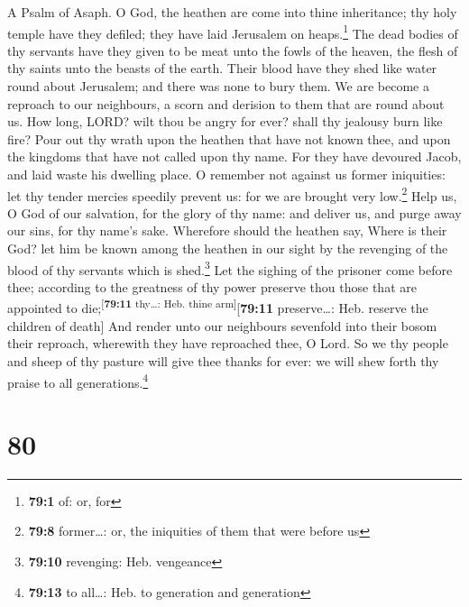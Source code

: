 A Psalm of Asaph.  O God, the heathen are come into thine
inheritance; thy holy temple have they defiled; they have laid Jerusalem
on heaps.\footnote{\textbf{79:1} of: or, for}  The dead
bodies of thy servants have they given to be meat unto the fowls of the
heaven, the flesh of thy saints unto the beasts of the earth.
 Their blood have they shed like water round about
Jerusalem; and there was none to bury them.  We are become
a reproach to our neighbours, a scorn and derision to them that are
round about us.  How long, LORD? wilt thou be angry for
ever? shall thy jealousy burn like fire?  Pour out thy
wrath upon the heathen that have not known thee, and upon the kingdoms
that have not called upon thy name.  For they have
devoured Jacob, and laid waste his dwelling place.  O
remember not against us former iniquities: let thy tender mercies
speedily prevent us: for we are brought very low.\footnote{\textbf{79:8}
  former\ldots: or, the iniquities of them that were before us}
 Help us, O God of our salvation, for the glory of thy
name: and deliver us, and purge away our sins, for thy name's sake.
 Wherefore should the heathen say, Where is their God?
let him be known among the heathen in our sight by the revenging of the
blood of thy servants which is shed.\footnote{\textbf{79:10} revenging:
  Heb. vengeance}  Let the sighing of the prisoner come
before thee; according to the greatness of thy power preserve thou those
that are appointed to die;\textsuperscript{{[}\textbf{79:11} thy\ldots:
Heb. thine arm{]}}{[}\textbf{79:11} preserve\ldots: Heb. reserve the
children of death{]}  And render unto our neighbours
sevenfold into their bosom their reproach, wherewith they have
reproached thee, O Lord.  So we thy people and sheep of
thy pasture will give thee thanks for ever: we will shew forth thy
praise to all generations.\footnote{\textbf{79:13} to all\ldots: Heb. to
  generation and generation}

\hypertarget{section-79}{%
\section{80}\label{section-79}}

